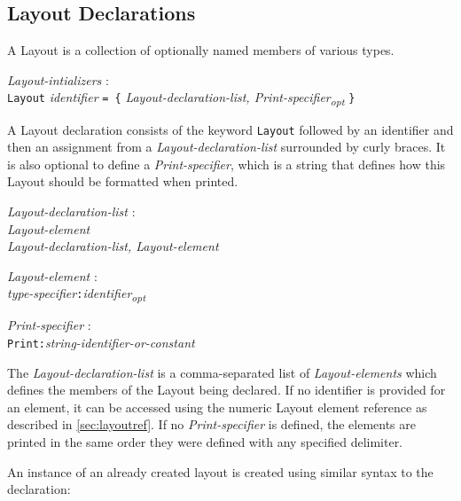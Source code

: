 \documentclass{article}
\begin{document}
\subsection{Layout Declarations}
\label{sec:layout}
A Layout is a collection of optionally named members of various types.
\begin{tabbing}
	\= \emph{Layout}\=\emph{-intializers} : \\
		\> \> \texttt{Layout} \emph{identifier} \texttt{= \{} \emph{Layout-declaration-list, Print-specifier\textsubscript{opt}} \texttt{\}}
\end{tabbing}
A Layout declaration consists of the keyword \texttt{Layout} followed by an identifier and then an assignment from a  \emph{Layout-declaration-list} surrounded by curly braces. It is also optional to define a \emph{Print-specifier}, which is a string that defines how this Layout should be formatted when printed.
\begin{tabbing}
	\= \emph{Layout}\=\emph{-declaration-list} : \\
		\> \> \emph{Layout-element} \\
		\>\> \emph{Layout-declaration-list, Layout-element}
\end{tabbing}
\begin{tabbing}
	\= \emph{Layout}\=\emph{-element} : \\
		\> \> \emph{type-specifier}\texttt{:}\emph{identifier\textsubscript{opt}}
\end{tabbing}
\begin{tabbing}
	\= \emph{Print}\=\emph{-specifier} : \\
		\> \> \texttt{Print:}\emph{string-identifier-or-constant}
\end{tabbing}
The \emph{Layout-declaration-list} is a comma-separated list of \emph{Layout-elements} which defines the members of the Layout being declared. If no identifier is provided for an element, it can be accessed using the numeric Layout element reference as described in \ref{sec:layoutref}. If no \emph{Print-specifier} is defined, the elements are printed in the same order they were defined with any specified delimiter.

An instance of an already created layout is created using similar syntax to the declaration:
\end{document}
